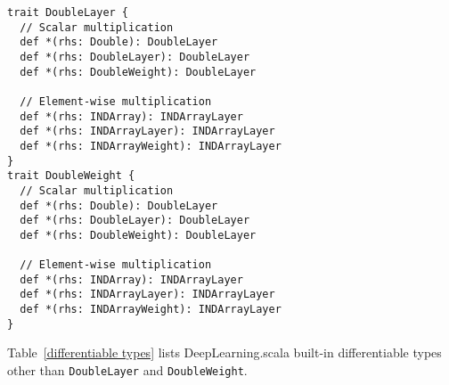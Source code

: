 \begin{lstlisting}[float={h t b p},caption={The hypothetical type signature of multiplication operator for \lstinline{DoubleLayer} and \lstinline{DoubleWeight}},label={hypothetical differentiable types}]
trait DoubleLayer {
  // Scalar multiplication
  def *(rhs: Double): DoubleLayer
  def *(rhs: DoubleLayer): DoubleLayer
  def *(rhs: DoubleWeight): DoubleLayer

  // Element-wise multiplication
  def *(rhs: INDArray): INDArrayLayer
  def *(rhs: INDArrayLayer): INDArrayLayer
  def *(rhs: INDArrayWeight): INDArrayLayer
}
trait DoubleWeight {
  // Scalar multiplication
  def *(rhs: Double): DoubleLayer
  def *(rhs: DoubleLayer): DoubleLayer
  def *(rhs: DoubleWeight): DoubleLayer

  // Element-wise multiplication
  def *(rhs: INDArray): INDArrayLayer
  def *(rhs: INDArrayLayer): INDArrayLayer
  def *(rhs: INDArrayWeight): INDArrayLayer
}
\end{lstlisting}

Table~\ref{differentiable types} lists DeepLearning.scala built-in differentiable types other than \lstinline{DoubleLayer} and \lstinline{DoubleWeight}.

